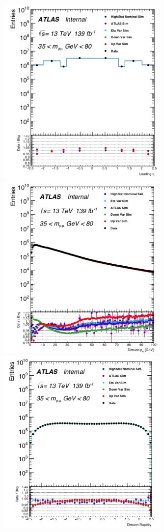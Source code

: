 \begin{figure}[!htb]
\begin{center}
        \includegraphics[width=0.75\textwidth]{figures/chapter_dimuon/MCDataCompare3}
        \includegraphics[width=0.75\textwidth]{figures/chapter_dimuon/MCDataCompare4}
        \includegraphics[width=0.75\textwidth]{figures/chapter_dimuon/MCDataCompare5}

\end{center}
\end{figure}
